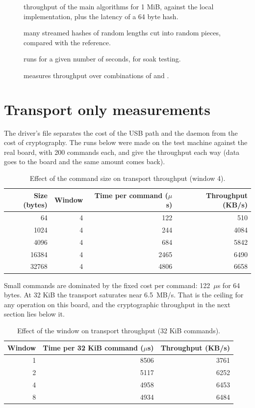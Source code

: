 \begin{description}
  \item[] throughput of the main algorithms for 1 MiB, against the local implementation, plus the latency of a 64 byte hash.
  \item[] many streamed hashes of random lengths cut into random pieces, compared with the reference.
  \item[] runs for a given number of seconds, for soak testing.
  \item[] measures throughput over combinations of  and .
\end{description}

\section{Transport only measurements}\label{sec:transport}

The driver's  file separates the cost of the USB path and the daemon from the cost of cryptography. The runs below were made on the test machine against the real board, with 200 commands each, and give the throughput each way (data goes to the board and the same amount comes back).

\begin{table}[ht]
\centering
\begin{tabular}{rrrr}
\toprule
Size (bytes) & Window & Time per command ($\mu$s) & Throughput (KB/s) \\
\midrule
64 & 4 & 122 & 510 \\
1024 & 4 & 244 & 4084 \\
4096 & 4 & 684 & 5842 \\
16384 & 4 & 2465 & 6490 \\
32768 & 4 & 4806 & 6658 \\
\bottomrule
\end{tabular}
\caption{Effect of the command size on transport throughput (window 4).}
\end{table}

Small commands are dominated by the fixed cost per command: 122~$\mu$s for 64 bytes. At 32 KiB the transport saturates near 6.5~MB/s. That is the ceiling for any operation on this board, and the cryptographic throughput in the next section lies below it.

\begin{table}[ht]
\centering
\begin{tabular}{rrr}
\toprule
Window & Time per 32 KiB command ($\mu$s) & Throughput (KB/s) \\
\midrule
1 & 8506 & 3761 \\
2 & 5117 & 6252 \\
4 & 4958 & 6453 \\
8 & 4934 & 6484 \\
\bottomrule
\end{tabular}
\caption{Effect of the window on transport throughput (32 KiB commands).}\label{tab:window}
\end{table}

